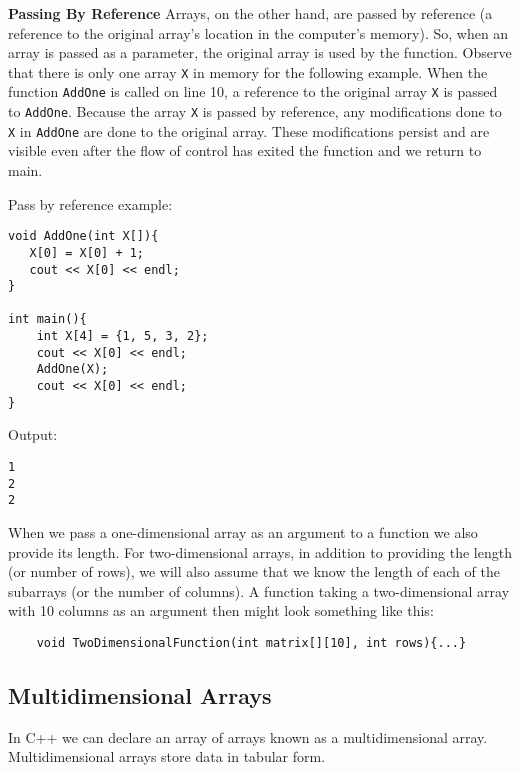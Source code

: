 \textbf{Passing By Reference} Arrays, on the other hand, are passed by reference (a reference to the original array’s location in the computer’s memory). So, when an array is passed as a parameter, the original array is used by the function. Observe that there is only one array \texttt{X} in memory for the following example. When the function \texttt{AddOne} is called on line 10, a reference to the original array \texttt{X} is passed to \texttt{AddOne}. Because the array \texttt{X} is passed by reference, any modifications done to \texttt{X} in \texttt{AddOne} are done to the original array. These modifications persist and are visible even after the flow of control has exited the function and we return to main.

\begin{example}
    Pass by reference example:

    \begin{verbatim}
void AddOne(int X[]){
   X[0] = X[0] + 1;
   cout << X[0] << endl;
}

int main(){
    int X[4] = {1, 5, 3, 2};
    cout << X[0] << endl;
    AddOne(X);
    cout << X[0] << endl;
}
    \end{verbatim}

    Output:

    \begin{verbatim}
1
2
2
    \end{verbatim}
\end{example}

When we pass a one-dimensional array as an argument to a function we also provide its length. For two-dimensional arrays, in addition to providing the length (or number of rows), we will also assume that we know the length of each of the subarrays (or the number of columns). A function taking a two-dimensional array with 10 columns as an argument then might look something like this:

\begin{verbatim}
    void TwoDimensionalFunction(int matrix[][10], int rows){...}
\end{verbatim}

\subsection{Multidimensional Arrays}

In C++ we can declare an array of arrays known as a multidimensional array. Multidimensional arrays store data in tabular form.


